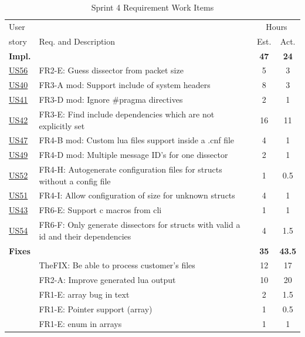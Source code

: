 \begin{table}[!htbp] \small \center
\caption{Sprint 4 Requirement Work Items \label{tab:sprint4req}}
\begin{tabularx}{\textwidth}{l X c c}
	\toprule
	User & & \multicolumn{2}{c}{Hours} \\
	\cmidrule(r){3-4}
	story & Req. and Description & Est. & Act. \\
	\midrule
	\textbf{Impl.} &  & \textbf{47} & \textbf{24} \\
	\hyperref[tab:req:stories13]{US56} & FR2-E: Guess \gls{dissector} from \gls{packet} size & 5 & 3 \\
 	\hyperref[tab:req:stories10]{US40} & FR3-A mod: Support \gls{include} of system \glspl{header} &  8  & 3 \\
	\hyperref[tab:req:stories10]{US41} & FR3-D mod: Ignore \#pragma directives & 2 & 1 \\
	\hyperref[tab:req:stories10]{US42} & FR3-E: Find include dependencies which are not explicitly set & 16  & 11 \\
	\hyperref[tab:req:stories11]{US47} & FR4-B mod: Custom \Gls{lua} files support inside a .cnf file & 4 & 1 \\
	\hyperref[tab:req:stories12]{US49} & FR4-D mod: Multiple message ID's for one \gls{dissector} & 2 & 1 \\
	\hyperref[tab:req:stories12]{US52} & FR4-H: Autogenerate configuration files for \glspl{struct} without a config file & 1  & 0.5\\
	\hyperref[tab:req:stories12]{US51} & FR4-I: Allow configuration of size for unknown \glspl{struct} & 4 & 1 \\
	\hyperref[tab:req:stories10]{US43} & FR6-E: Support \Gls{c} macros from \gls{cli} & 1 & 1 \\
	\hyperref[tab:req:stories12]{US54} & FR6-F: Only generate \glspl{dissector} for \glspl{struct} with valid a id and their dependencies & 4 & 1.5 \\
	\addlinespace
	\textbf{Fixes} &  & \textbf{35} & \textbf{43.5} \\
	& TheFIX: Be able to process customer's files & 12 & 17 \\
	 & FR2-A: Improve generated \Gls{lua} output & 10 & 20 \\
	 & FR1-E: \Gls{array} bug in text & 2 & 1.5 \\
	 & FR1-E: Pointer support (array) & 1 & 0.5 \\
	 & FR1-E: \Gls{enum} in \glspl{array} & 1 & 1 \\		

\end{tabularx}
\end{table}
